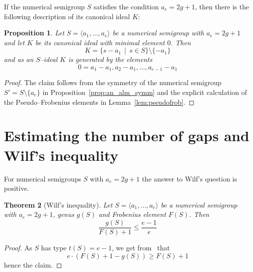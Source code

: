 \documentclass[a4paper,12pt,scrbook]{amsart}
\theoremstyle{plain}%
\newtheorem{satz}{Theorem}[section]
\newtheorem{proposition}[satz]{Proposition}
\theoremstyle{definition}
\begin{document}
If the numerical semigroup $S$ satisfies the condition $a_e=2g+1$, then there is the following description of its canonical ideal $K$:
\begin{proposition}
Let $S = \langle a_1, \ldots, a_e\rangle$ be a numerical semigroup with $a_e=2g+1$ and let $K$ be its canonical 
ideal with minimal element $0$. Then
\[K=\{s-a_1\,\mid\,s\in S\}\setminus\{-a_1\}\]
and as an $S$--ideal $K$ is generated by the elements
	\[ 0 = a_1-a_1, a_2-a_1, \ldots, a_{e-1}-a_1\]
\end{proposition}

\begin{proof}
The claim follows from the symmetry of the numerical semigroup 
$S'=S\setminus\{a_e\}$ in Proposition~\ref{prop:an_alm_symm} 
and the explicit calculation of the Pseudo--Frobenius elements in  Lemma~\ref{lem:pseudofrob}.
\end{proof}

\section{Estimating the number of gaps and Wilf's inequality}\label{sect:Wilf}

For numerical semigroups $S$ with $a_e = 2g+1$ the answer to 
Wilf's question is positive.

\begin{satz}[Wilf's inequality]\label{thm:an_wilf}
Let $S = \langle a_1, \ldots, a_e\rangle$ be a numerical semigroup with 
$a_e = 2g+1$, genus $g(S)$ and Frobenius element $F(S)$. Then 
	\begin{equation}\label{eq:wilf} 
	\frac {g(S)}{F(S)+1} \leq \frac {e-1}{e} 
	\end{equation}
\end{satz}

\begin{proof}
As $S$ has type $t(S) = e-1$, we get from~\cite[Theorem 20]{FGH} that 
	$$ e \cdot (F(S)+1-g(S)) \geq F(S) +1 $$
hence the claim. 
\end{proof}
\end{document}
